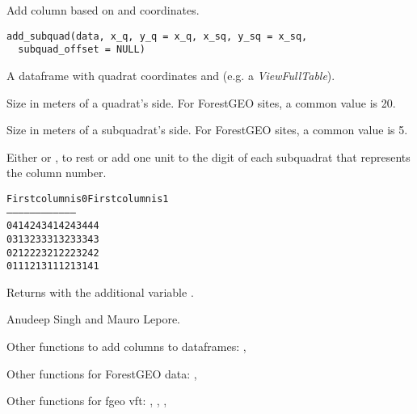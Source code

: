 \documentclass[a4paper]{book}
\begin{document}
%
\begin{Description}\relax
Add column  based on  and  coordinates.
\end{Description}
%
\begin{Usage}
\begin{verbatim}
add_subquad(data, x_q, y_q = x_q, x_sq, y_sq = x_sq,
  subquad_offset = NULL)
\end{verbatim}
\end{Usage}
%
\begin{Arguments}
\begin{ldescription}
\item[\code{data}] A dataframe with quadrat coordinates  and  (e.g. a
\emph{ViewFullTable}).

\item[\code{x\_q, y\_q}] Size in meters of a quadrat's side. For ForestGEO sites, a
common value is 20.

\item[\code{x\_sq, y\_sq}] Size in meters of a subquadrat's side. For ForestGEO sites,
a common value is 5.

\item[\code{subquad\_offset}] Either  or , to rest or add one unit to the
digit of each subquadrat that represents the column number.\begin{alltt}First column is 0    First column is 1
-----------------    -----------------
   04 14 24 34          14 24 34 44
   03 13 23 33          13 23 33 43
   02 12 22 32          12 22 32 42
   01 11 21 31          11 21 31 41
\end{alltt}

\end{ldescription}
\end{Arguments}
%
\begin{Value}
Returns  with the additional variable .
\end{Value}
%
\begin{Author}\relax
Anudeep Singh and Mauro Lepore.
\end{Author}
%
\begin{SeeAlso}\relax
Other functions to add columns to dataframes: ,

Other functions for ForestGEO data: ,

Other functions for fgeo vft: ,
, ,
\end{SeeAlso}
\end{document}

